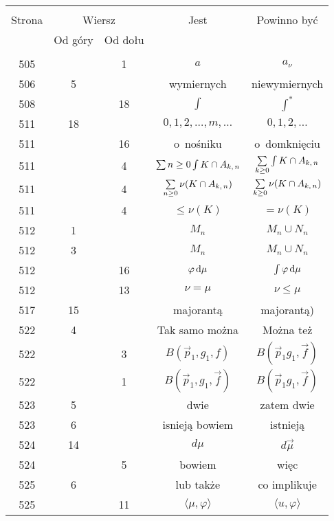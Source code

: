 \documentclass[a4paper,11pt]{article}
\newcommand{\IntL}{\int\limits}
\newcommand{\vp}{\varphi}
\newcommand{\ld}{\ldots}
\begin{document}
\begin{center}
  \begin{tabular}{|c|c|c|c|c|}
    \hline
    & \multicolumn{2}{c|}{} & & \\
    Strona & \multicolumn{2}{c|}{Wiersz}& Jest & Powinno być \\ \cline{2-3}
    & Od góry & Od dołu &  &  \\ \hline
    & & & & \\
    505 & & 1 & $a$ & $a_{ \nu }$ \\
    506 & 5 & & wymiernych & niewymiernych \\
    508 & & 18 & $\int$ & $\int^{ * }$ \\
    511 & 18 & & $0, 1, 2, \ld, m, \ld$ & $0, 1, 2, \ld$ \\
    511 & & 16 & o~nośniku & o~domknięciu \\
    511 & & 4 & $\Sum{ n \geq 0 } \IntL{ K \cap A_{ k,\, n } }$
           & $\Sum_{ k \geq 0 } \IntL{ K \cap A_{ k,\, n } }$ \\
    511 & & 4 & $\sum\limits_{ n \geq 0 } \nu( K \cap A_{ k,\, n } )$
           & $\sum\limits_{ k \geq 0 } \nu( K \cap A_{ k,\, n } )$ \\
    511 & & 4 & $\leq \nu( K )$ & $= \nu( K )$ \\
    512 & 1 & & $M_{ n }$ & $M_{ n } \cup N_{ n }$ \\
    512 & 3 & & $M_{ n }$ & $M_{ n } \cup N_{ n }$ \\
    512 & & 16 & $\vp\, \de \mu$ & $\int \vp\, \de \mu$ \\
    512 & & 13 & $\nu = \mu$ & $\nu \leq \mu$ \\
    517 & 15 & & majorantą & majorantą) \\
    522 & 4 & & Tak samo można & Można też \\
    522 & & 3 & $B( \vec{ p }_{ 1 }, g_{ 1 }, f )$
           & $B( \vec{ p }_{ 1 } g_{ 1 }, \vec{ f } )$ \\
    522 & & 1 & $B( \vec{ p }_{ 1 }, g_{ 1 }, \vec{ f } )$
           & $B( \vec{ p }_{ 1 } g_{ 1 }, \vec{ f } )$ \\
    523 & 5 & & dwie & zatem dwie \\
    523 & 6 & & isnieją bowiem & istnieją \\
    524 & 14 & & $d \mu$ & $d \vec{ \mu }$ \\
    524 & & 5 & bowiem & więc \\
    525 & 6 & & lub także & co implikuje \\
    525 & & 11 & $\langle \mu, \varphi \rangle$
           & $\langle u, \varphi \rangle$ \\

\end{tabular}
\end{center}
\end{document}
